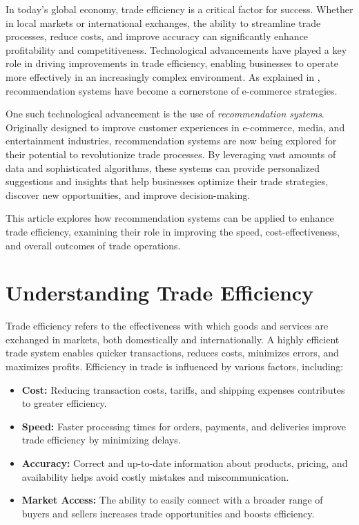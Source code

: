 \documentclass[10pt,twoside,slovak,a4paper]{article}
\begin{document}
In today’s global economy, trade efficiency is a critical factor for success. Whether in local markets or international exchanges, the ability to streamline trade processes, reduce costs, and improve accuracy can significantly enhance profitability and competitiveness. Technological advancements have played a key role in driving improvements in trade efficiency, enabling businesses to operate more effectively in an increasingly complex environment. As explained in \cite{aggarwal2016}, recommendation systems have become a cornerstone of e-commerce strategies.

One such technological advancement is the use of \textit{recommendation systems}. Originally designed to improve customer experiences in e-commerce, media, and entertainment industries, recommendation systems are now being explored for their potential to revolutionize trade processes. By leveraging vast amounts of data and sophisticated algorithms, these systems can provide personalized suggestions and insights that help businesses optimize their trade strategies, discover new opportunities, and improve decision-making.

This article explores how recommendation systems can be applied to enhance trade efficiency, examining their role in improving the speed, cost-effectiveness, and overall outcomes of trade operations.



\section{Understanding Trade Efficiency}

Trade efficiency refers to the effectiveness with which goods and services are exchanged in markets, both domestically and internationally. A highly efficient trade system enables quicker transactions, reduces costs, minimizes errors, and maximizes profits. Efficiency in trade is influenced by various factors, including:

\begin{itemize}
    \item \textbf{Cost:} Reducing transaction costs, tariffs, and shipping expenses contributes to greater efficiency.
    \item \textbf{Speed:} Faster processing times for orders, payments, and deliveries improve trade efficiency by minimizing delays.
    \item \textbf{Accuracy:} Correct and up-to-date information about products, pricing, and availability helps avoid costly mistakes and miscommunication.
    \item \textbf{Market Access:} The ability to easily connect with a broader range of buyers and sellers increases trade opportunities and boosts efficiency.
\end{itemize}
\end{document}
